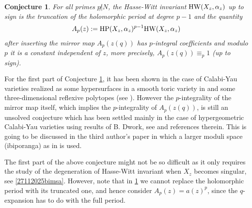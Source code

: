\documentclass[11pt,leqno]{article}
\newtheorem{conj}{Conjecture}
\theoremstyle{remark}
\theoremstyle{definition}
\begin{document}
\begin{conj}\rm
\label{17112025ymsc}
For all primes $p\not| N$,
the Hasse-Witt invariant ${\rm HW}(X_z,\alpha_z)$ up to sign  is the truncation of the holomorphic period at degree $p-1$  and  the quantity
$$
A_p(z):={\rm HP}(X_z,\alpha_z)^{p-1}
{\rm HW}(X_z,\alpha_z)
$$
after inserting the mirror map $A_p(z(q))$ has $p$-integral coefficients and modulo $p$ it is a  constant independent of $z$, more precisely, $A_p(z(q))\equiv_p 1$ (up to sign).
\end{conj}
For the first part of Conjecture \ref{17112025ymsc}, it has been shown in the case of Calabi-Yau varieties realized as some hypersurfaces in a smooth toric variety in \cite{HLYY23} and some three-dimensional reflexive polytopes (see \cite[Main Theorem]{SalernoWhitcher22}). However the $p$-integrality of the mirror map itself, which implies the $p$-integrality of $A_p(z(q))$, is still an unsolved conjecture which has been settled mainly in the case of hypergeometric Calabi-Yau varieties using results of B. Dwork, see \cite[Appendix C]{GMCD-MQCY3} and references therein. This is going to be discussed in the third author's paper \cite{Ibiporanga} in which a larger moduli space (ibiporanga) as in \cite{ho2020, GMCD-MQCY3} is used.    

The first part of the above conjecture might not be so difficult as it only requires the study of the degeneration of Hasse-Witt invariant when $X_z$ becomes singular, see \cref{27112025bimsa}. However, note that in \cref{17112025ymsc} we cannot replace the holomorphic period with its truncated one, and hence consider $A_p(z)=a(z)^{p}$,  since the $q$-expansion has to do with the full period.
\end{document}
